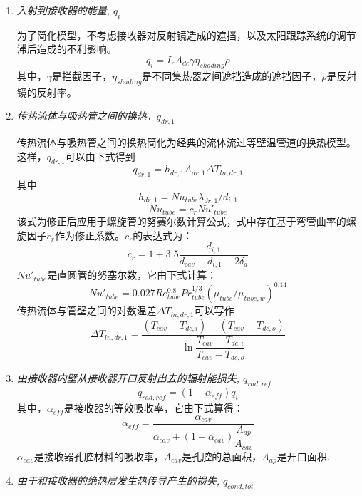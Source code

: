 \begin{enumerate}[label=(\arabic*)]
  \item \emph{入射到接收器的能量, $q_i$}
  
\setlength\parindent{2em}
为了简化模型，不考虑接收器对反射镜造成的遮挡，以及太阳跟踪系统的调节滞后造成的不利影响。
  \begin{equation}
      q_i = I_r A_{dc} \gamma \eta_{shading} \rho
      \label{eq:q_i}
  \end{equation}
其中，$\gamma$是拦截因子，$\eta_{shading}$是不同集热器之间遮挡造成的遮挡因子，$\rho$是反射镜的反射率。
  \item \emph{传热流体与吸热管之间的换热，$q_{dr,1}$}
  
  传热流体与吸热管之间的换热简化为经典的流体流过等壁温管道的换热模型。这样，$q_{dr,1}$可以由下式得到
  \begin{equation}
      q_{dr,1} = h_{dr,1}A_{dr,1}\Delta T_{ln,dr,1}
      \label{eq:q_dr_1}
  \end{equation}
  其中  
  \begin{equation}
      h_{dr,1} = Nu_{tube}\lambda_{dr,1} / d_{i,1}
\end{equation}
\begin{equation}
      Nu_{tube} = c_r Nu'_{tube}
\end{equation}
    该式为修正后应用于螺旋管的努赛尔数计算公式，式中存在基于弯管曲率的螺旋因子$c_r$作为修正系数。$c_r$的表达式为\cite{Pablo2008}：
\begin{equation}
	c_{r}=1+3.5\frac{d_{i,1}}{d_{cav}-d_{i,1}-2\delta_{a}}
\end{equation}
$Nu'_{tube}$是直圆管的努塞尔数，它由下式计算：\cite{Serth2007}
\begin{equation}
	Nu'_{tube}= 0.027Re_{tube}^{0.8}Pr_{tube}^{1/3}(\mu_{tube}/\mu_{tube,w})^{0.14}
\end{equation}
传热流体与管壁之间的对数温差$\Delta{}T_{ln,dr,1}$可以写作
\begin{equation}
	\Delta{}T_{ln,dr,1}=\frac{(T_{cav}-T_{dc,i})-(T_{cav}-T_{dc,o})}{\ln\dfrac{T_{cav}-T_{dc,i}}{T_{cav}-T_{dc,o}}}
\end{equation}

  \item \emph{由接收器内壁从接收器开口反射出去的辐射能损失, $q_{rad,ref}$}
  \begin{equation}
    q_{rad,ref}=(1-\alpha_{eff})q_{i}
\end{equation}
    其中，$\alpha_{eff}$是接收器的等效吸收率，它由下式算得：
    \begin{equation}
    \alpha_{eff}=\frac{\alpha_{cav}}{\alpha_{cav}+(1-\alpha_{cav})\dfrac{A_{ap}}{A_{cav}}}
    \end{equation} 
$\alpha_{cav}$是接收器孔腔材料的吸收率，$A_{cav}$是孔腔的总面积，$A_{ap}$是开口面积.
  \item \emph{由于和接收器的绝热层发生热传导产生的损失, $q_{cond,tot}$}
  

\end{enumerate}

